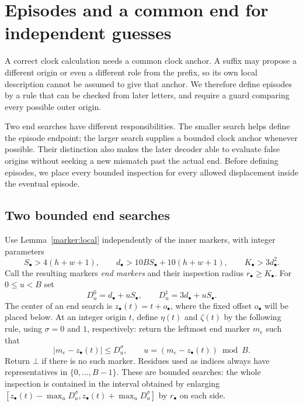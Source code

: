 \section{Episodes and a common end for independent guesses}
\label{episode:section}

A correct clock calculation needs a common clock anchor. A suffix may
propose a different origin or even a different role from the prefix, so
its own local description cannot be assumed to give that anchor. We
therefore define episodes by a rule that can be checked from later
letters, and require a guard comparing every possible outer origin.

Two end searches have different responsibilities. The smaller search
helps define the episode endpoint; the larger search supplies a bounded
clock anchor whenever possible. Their distinction also makes the later
decoder able to evaluate false origins without seeking a new mismatch
past the actual end. Before defining episodes, we place every bounded
inspection for every allowed displacement inside the eventual episode.

\subsection{Two bounded end searches}

Use Lemma~\ref{marker:local} independently of the inner markers, with
integer parameters
\begin{equation}\label{episode:marker-parameters}
 S_\bullet>4(h+w+1),\qquad
 d_\bullet>10BS_\bullet+10(h+w+1),\qquad
 K_\bullet>3d_\bullet^2.
\end{equation}
Call the resulting markers \emph{end markers} and their inspection radius
$r_\bullet\ge K_\bullet$.  For $0\le u<B$ set
\begin{equation}\label{episode:end-widths}
 D_u^0=d_\bullet+uS_\bullet,
 \qquad D_u^1=3d_\bullet+uS_\bullet.
\end{equation}
The center of an end search is $z_\bullet(t)=t+o_\bullet$, where the fixed
offset $o_\bullet$ will be placed below.  At an integer origin $t$, define
$\eta(t)$ and $\zeta(t)$ by the following rule, using $\sigma=0$ and $1$,
respectively: return the leftmost end marker $m_e$ such that
\begin{equation}\label{episode:eligibility}
 |m_e-z_\bullet(t)|\le D_u^\sigma,
 \qquad u=(m_e-z_\bullet(t))\bmod B.
\end{equation}
Return $\bot$ if there is no such marker.  Residues used as indices always
have representatives in $\{0,\ldots,B-1\}$.  These are bounded searches:
the whole inspection is contained in the interval obtained by enlarging
$[z_\bullet(t)-\max_uD_u^\sigma,z_\bullet(t)+\max_uD_u^\sigma]$
by $r_\bullet$ on each side.

